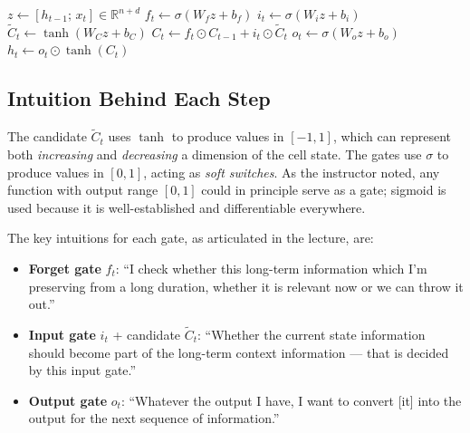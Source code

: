 \documentclass[12pt,a4paper]{article}
\begin{document}
\begin{algorithm}[ht]
  \DontPrintSemicolon
  \caption{LSTM Cell Forward Pass}
  \label{alg:lstm-forward}
  \BlankLine
  $z \leftarrow [h_{t-1};\, x_t] \in \mathbb{R}^{n+d}$\;
  \BlankLine
  $f_t \leftarrow \sigma(W_f z + b_f)$\;
  \BlankLine
  $i_t \leftarrow \sigma(W_i z + b_i)$\;
  \BlankLine
  $\tilde{C}_t \leftarrow \tanh(W_C z + b_C)$\;
  \BlankLine
  $C_t \leftarrow f_t \odot C_{t-1} + i_t \odot \tilde{C}_t$\;
  \BlankLine
  $o_t \leftarrow \sigma(W_o z + b_o)$\;
  \BlankLine
  $h_t \leftarrow o_t \odot \tanh(C_t)$\;
  \BlankLine
\end{algorithm}

\subsection{Intuition Behind Each Step}
\label{subsec:intuition}

\begin{keyinsight}[title=Why Tanh for the Candidate, Sigmoid for Gates?]
  The candidate $\tilde{C}_t$ uses $\tanh$ to produce values in $[-1,1]$,
  which can represent both \emph{increasing} and \emph{decreasing} a
  dimension of the cell state. The gates use $\sigma$ to produce values in
  $[0,1]$, acting as \emph{soft switches}. As the instructor noted, any
  function with output range $[0,1]$ could in principle serve as a gate;
  sigmoid is used because it is well-established and differentiable
  everywhere.
\end{keyinsight}

The key intuitions for each gate, as articulated in the lecture, are:

\begin{itemize}
  \item \textbf{Forget gate} $f_t$: ``I check whether this long-term
        information which I'm preserving from a long duration, whether it
        is relevant now or we can throw it out.''
  \item \textbf{Input gate} $i_t$ + candidate $\tilde{C}_t$: ``Whether
        the current state information should become part of the long-term
        context information --- that is decided by this input gate.''
  \item \textbf{Output gate} $o_t$: ``Whatever the output I have, I want
        to convert [it] into the output for the next sequence of
        information.''
\end{itemize}
\end{document}
